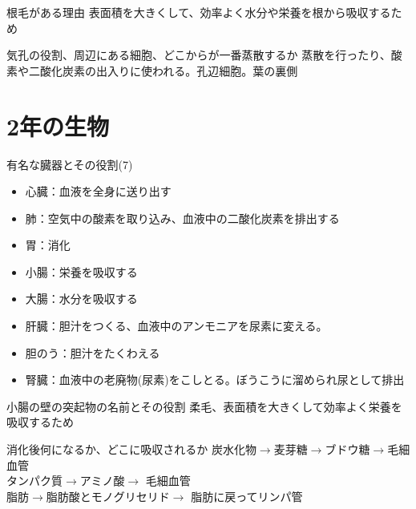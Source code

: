 \documentclass[10pt,dvipdfmx]{jsarticle}
\newcommand{\answer}[2]{{\color{orange}#2}}
\newcommand{\question}[2]{{\color{orange}#2}}
\newcommand{\answer}[2]{\vspace{#1mm}}
\newcommand{\question}[2]{#1}
\begin{document}
\begin{itembox}[l]{根毛がある理由}
	\answer{10}{表面積を大きくして、効率よく水分や栄養を根から吸収するため}
\end{itembox}

\begin{itembox}[l]{気孔の役割、周辺にある細胞、どこからが一番蒸散するか}
	\answer{10}{蒸散を行ったり、酸素や二酸化炭素の出入りに使われる。孔辺細胞。葉の裏側}
\end{itembox}



\section{2年の生物}
\begin{itembox}[l]{有名な臓器とその役割(7)}
	\question{
		\Large{
			\begin{itemize}
				\item \item \item \item \item \item \item
			\end{itemize}
		}
	}{
		\begin{itemize}
			\item 心臓：血液を全身に送り出す
			\item 肺：空気中の酸素を取り込み、血液中の二酸化炭素を排出する
			\item 胃：消化
			\item 小腸：栄養を吸収する
			\item 大腸：水分を吸収する
			\item 肝臓：胆汁をつくる、血液中のアンモニアを尿素に変える。
			\item 胆のう：胆汁をたくわえる
			\item 腎臓：血液中の老廃物(尿素)をこしとる。ぼうこうに溜められ尿として排出
		\end{itemize}
	}
\end{itembox}


\begin{itembox}[l]{小腸の壁の突起物の名前とその役割}
	\answer{10}{柔毛、表面積を大きくして効率よく栄養を吸収するため}
\end{itembox}

\begin{itembox}[l]{消化後何になるか、どこに吸収されるか}
	\answer{10}{
		炭水化物$\rightarrow$麦芽糖$\rightarrow$ブドウ糖$\rightarrow$毛細血管\\
		タンパク質$\rightarrow$アミノ酸$\rightarrow$ 毛細血管\\
		脂肪$\rightarrow$脂肪酸とモノグリセリド$\rightarrow$ 脂肪に戻ってリンパ管
	}
\end{itembox}
\end{document}
